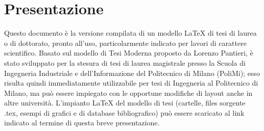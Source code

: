 %
%
\chapter*{Presentazione}
%
%
%
%
Questo documento è la versione compilata di un modello \LaTeX{} di tesi di laurea o di dottorato, pronto all'uso, particolarmente indicato per lavori di carattere scientifico. Basato sul modello di Tesi Moderna proposto da Lorenzo Pantieri, è stato sviluppato per la stesura di tesi di laurea magistrale presso la Scuola di Ingegneria Industriale e dell'Informazione del Politecnico di Milano (PoliMi); esso risulta quindi immediatamente utilizzabile per tesi di Ingegneria al Politecnico di Milano, ma può essere impiegato con le opportune modifiche di layout anche in altre università. L'impianto \LaTeX{} del modello di tesi (cartelle, files sorgente .tex, esempi di grafici e di database bibliografico) può essere scaricato al link indicato al termine di questa breve presentazione.
%
%
